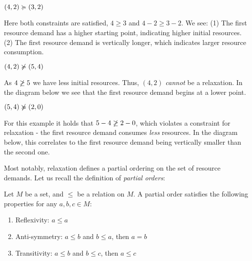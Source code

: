 \begin{example}
   \((4, 2) \succcurlyeq (3, 2)\)

Here both constraints are satisfied, \(4 \geq 3\) and \(4 - 2 \geq 3 - 2\). We see: (1) The first resource demand has a higher starting point, indicating higher initial resources. (2) The first resource demand is vertically longer, which indicates larger resource consumption.


\end{example}

\begin{example}
   \((4,2) \notrelaxation (5, 4)\)

As \(4 \centernot{\geq} 5\) we have less initial resources. Thus, \((4,2)\) \emph{cannot} be a relaxation. In the diagram below we see that the first resource demand begins at a lower point.


\end{example}

\begin{example}
   \((5, 4) \notrelaxation (2, 0)\)

For this example it holds that \(5 - 4 \centernot{\geq} 2 - 0\), which violates a constraint for relaxation - the first resource demand consumes \emph{less} resources. In the diagram below, this correlates to the first resource demand being vertically smaller than the second one.


\end{example}

Most notably, relaxation defines a partial ordering on the set of resource demands. Let us recall the definition of \emph{partial orders}:

\begin{definition}
   Let \(M\) be a set, and \(\leq\) be a relation on \(M\). A partial order satisfies the following properties for any \(a, b, c \in M\):
   \begin{enumerate}[label=\Roman*]
      \item Reflexivity: \(a \leq a \) 
      \item Anti-symmetry: \(a \leq b\) and \(b \leq a\), then \(a = b\) 
      \item Transitivity: \(a \leq b\) and \(b \leq c\), then \(a \leq c\)
   \end{enumerate}
\end{definition}

